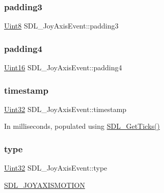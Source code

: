 \subsubsection{\texorpdfstring{padding3}{padding3}}
{\footnotesize\ttfamily \mbox{\hyperlink{_s_d_l__stdinc_8h_a2944638813a090aa23e62f4da842c3e2}{Uint8}} S\+D\+L\+\_\+\+Joy\+Axis\+Event\+::padding3}

\mbox{\label{struct_s_d_l___joy_axis_event_a604b258940a8cd8beaa5efeb55d6f825}} 
\subsubsection{\texorpdfstring{padding4}{padding4}}
{\footnotesize\ttfamily \mbox{\hyperlink{_s_d_l__stdinc_8h_a31fcc0a076c9068668173ee26d33e42b}{Uint16}} S\+D\+L\+\_\+\+Joy\+Axis\+Event\+::padding4}

\mbox{\label{struct_s_d_l___joy_axis_event_a60ecfc70df9eeef8e33b5dd7dc060389}} 
\subsubsection{\texorpdfstring{timestamp}{timestamp}}
{\footnotesize\ttfamily \mbox{\hyperlink{_s_d_l__stdinc_8h_add440eff171ea5f55cb00c4a9ab8672d}{Uint32}} S\+D\+L\+\_\+\+Joy\+Axis\+Event\+::timestamp}

In milliseconds, populated using \mbox{\hyperlink{_s_d_l__timer_8h_a0b9bc71d6287e0ffafdc3419760fe2b3}{S\+D\+L\+\_\+\+Get\+Ticks()}} \mbox{\label{struct_s_d_l___joy_axis_event_aed1c873fb90ba58194e65f972933c67d}} 
\subsubsection{\texorpdfstring{type}{type}}
{\footnotesize\ttfamily \mbox{\hyperlink{_s_d_l__stdinc_8h_add440eff171ea5f55cb00c4a9ab8672d}{Uint32}} S\+D\+L\+\_\+\+Joy\+Axis\+Event\+::type}

\mbox{\hyperlink{_s_d_l__events_8h_a3b589e89be6b35c02e0dd34a55f3fccaaf0803b3f8a12de3d85f81ebd7b514cd1}{S\+D\+L\+\_\+\+J\+O\+Y\+A\+X\+I\+S\+M\+O\+T\+I\+ON}} \mbox{\label{struct_s_d_l___joy_axis_event_a53ee73e7c367934dd6edb69963be5556}} 
